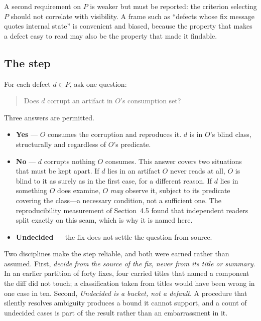 A second requirement on $P$ is weaker but must be reported: the criterion selecting
$P$ should not correlate with visibility. A frame such as ``defects whose fix
message quotes internal state'' is convenient and biased, because the property that
makes a defect easy to read may also be the property that made it findable.

\subsection{The step}

For each defect $d \in P$, ask one question:

\begin{quote}
Does $d$ corrupt an artifact in $O$'s consumption set?
\end{quote}

\noindent Three answers are permitted.

\begin{itemize}
\item \textbf{Yes} --- $O$ consumes the corruption and reproduces it. $d$ is in
      $O$'s blind class, structurally and regardless of $O$'s predicate.
\item \textbf{No} --- $d$ corrupts nothing $O$ consumes. This answer covers two
      situations that must be kept apart. If $d$ lies in an artifact $O$ never reads
      at all, $O$ is blind to it as surely as in the first case, for a different
      reason. If $d$ lies in something $O$ does examine, $O$ \emph{may} observe it,
      subject to its predicate covering the class---a necessary condition, not a
      sufficient one. The reproducibility measurement of Section~4.5 found that
      independent readers split exactly on this seam, which is why it is named here.
\item \textbf{Undecided} --- the fix does not settle the question from source.
\end{itemize}

Two disciplines make the step reliable, and both were earned rather than assumed.
First, \emph{decide from the source of the fix, never from its title or summary}.
In an earlier partition of forty fixes, four carried titles that named a
component the diff did not touch; a classification taken from titles would have been
wrong in one case in ten. Second, \emph{Undecided is a bucket, not a default}. A
procedure that silently resolves ambiguity produces a bound it cannot support, and
a count of undecided cases is part of the result rather than an embarrassment in it.

